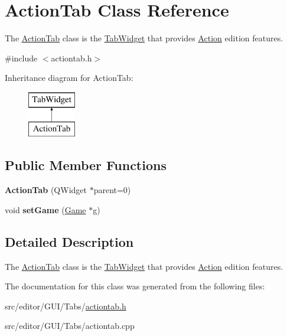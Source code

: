 \hypertarget{class_action_tab}{\section{\-Action\-Tab \-Class \-Reference}
\label{class_action_tab}
}


\-The \hyperlink{class_action_tab}{\-Action\-Tab} class is the \hyperlink{class_tab_widget}{\-Tab\-Widget} that provides \hyperlink{class_action}{\-Action} edition features.  




{\ttfamily \#include $<$actiontab.\-h$>$}

\-Inheritance diagram for \-Action\-Tab\-:\begin{figure}[H]
\begin{center}
\leavevmode
\includegraphics[height=2.000000cm]{class_action_tab}
\end{center}
\end{figure}
\subsection*{\-Public \-Member \-Functions}
\begin{DoxyCompactItemize}
\item 
\hypertarget{class_action_tab_a70597c139acf22dfb5d70c0ae58a645a}{{\bfseries \-Action\-Tab} (\-Q\-Widget $\ast$parent=0)}\label{class_action_tab_a70597c139acf22dfb5d70c0ae58a645a}

\item 
\hypertarget{class_action_tab_ad10d0267b5ec1bb86b3581e38ca13b34}{void {\bfseries set\-Game} (\hyperlink{class_game}{\-Game} $\ast$g)}\label{class_action_tab_ad10d0267b5ec1bb86b3581e38ca13b34}

\end{DoxyCompactItemize}


\subsection{\-Detailed \-Description}
\-The \hyperlink{class_action_tab}{\-Action\-Tab} class is the \hyperlink{class_tab_widget}{\-Tab\-Widget} that provides \hyperlink{class_action}{\-Action} edition features. 

\-The documentation for this class was generated from the following files\-:\begin{DoxyCompactItemize}
\item 
src/editor/\-G\-U\-I/\-Tabs/\hyperlink{actiontab_8h}{actiontab.\-h}\item 
src/editor/\-G\-U\-I/\-Tabs/actiontab.\-cpp\end{DoxyCompactItemize}
